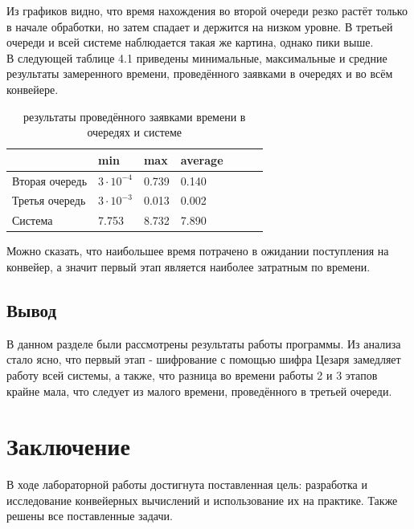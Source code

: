 \documentclass[12pt,a4paper]{report}
\begin{document}
Из графиков видно, что время нахождения во второй очереди резко растёт только в начале обработки, но затем 
спадает и держится на низком уровне.
В третьей очереди и всей системе наблюдается такая же картина, однако пики выше.\\

\newpage
В следующей таблице 4.1 приведены минимальные, максимальные и средние результаты замеренного времени, 
проведённого заявками в очередях и во всём конвейере.

\begin{table}[h!]
\caption{результаты проведённого заявками времени в очередях и системе}
\label{tabular:timesandtenses}
\begin{center}
\begin{tabular}{ | l | l | l | l | l | l | l | }
\hline
                   & min               & max   & average \\ \hline
    Вторая очередь & $3 \cdot 10^{-4}$ & 0.739 & 0.140   \\ \hline
    Третья очередь & $3 \cdot 10^{-3}$ & 0.013 & 0.002   \\ \hline
    Система        & 7.753             & 8.732 & 7.890   \\ \hline
\end{tabular}
\end{center}
\end{table}

Можно сказать, что наибольшее время потрачено в ожидании поступления на конвейер, а значит первый этап 
является наиболее затратным по времени.

\section{Вывод}

В данном разделе были рассмотрены результаты работы программы.
Из анализа стало ясно, что первый этап - шифрование с помощью шифра Цезаря замедляет работу всей системы, 
а также, что разница во времени работы 2 и 3 этапов крайне мала, что следует из малого времени, проведённого 
в третьей очереди.

\newpage
\chapter*{Заключение}

В ходе лабораторной работы достигнута поставленная цель: разработка и исследование конвейерных вычислений и 
использование их на практике. 
Также решены все поставленные задачи.
\end{document}
